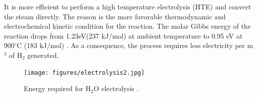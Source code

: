 \documentclass[11pt,letterpaper]{article}
\begin{document}
It is more efficient to perform a high temperature electrolysis (HTE) and convert the steam directly. The reason is the more favorable thermodynamic and electrochemical kinetic condition for the reaction. The molar Gibbs energy of the reaction drops from 1.23eV(237 kJ/mol) at ambient temperature to 0.95 eV at 900$^{\circ}$C (183 kJ/mol) \cite{helmeth_high_2020}. As a consequence, the process requires less electricity per m$^3$ of H$_2$ generated.

\begin{figure}[] %
	\centering
	\texttt{[image: figures/electrolysis2.jpg]}
	\hfill
	\caption{ Energy required for H$_2$O electrolysis \cite{helmeth_high_2020}.}
	\label{fig:nf2}
\end{figure}


\pagebreak


\end{document}
